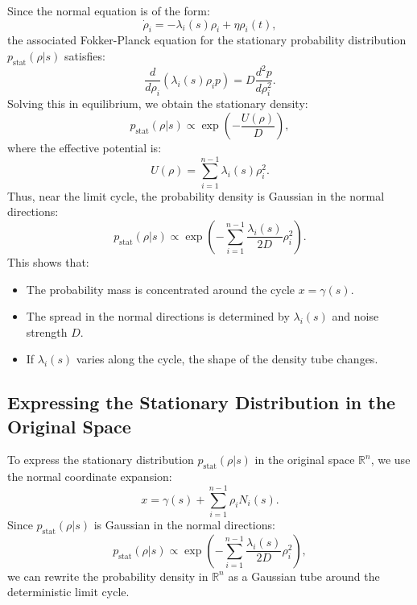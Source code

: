 \documentclass{article}
\theoremstyle{definition} \newtheorem{definition}{Definition}
\theoremstyle{remark} \newtheorem{remark}{Remark}
\newcounter{ct}
\begin{document}
Since the normal equation is of the form:
\begin{equation}
    \dot{\rho}_i = -\lambda_i(s) \rho_i + \eta \rho_i(t),
\end{equation}
the associated Fokker-Planck equation for the stationary probability distribution $p_{\text{stat}}(\rho | s)$ satisfies:
\begin{equation}
    \frac{d}{d \rho_i} \left( \lambda_i(s) \rho_i p \right) = D \frac{d^2 p}{d \rho_i^2}.
\end{equation}
Solving this in equilibrium, we obtain the stationary density:
\begin{equation}
    p_{\text{stat}}(\rho | s) \propto \exp \left( - \frac{U(\rho)}{D} \right),
\end{equation}
where the effective potential is:
\begin{equation}
    U(\rho) = \sum_{i=1}^{n-1} \lambda_i(s) \rho_i^2.
\end{equation}
Thus, near the limit cycle, the probability density is Gaussian in the normal directions:
\begin{equation}
    p_{\text{stat}}(\rho | s) \propto \exp \left( - \sum_{i=1}^{n-1} \frac{\lambda_i(s)}{2D} \rho_i^2 \right).
\end{equation}
This shows that:
\begin{itemize}
    \item The probability mass is concentrated around the cycle $x = \gamma(s)$.
    \item The spread in the normal directions is determined by $\lambda_i(s)$ and noise strength $D$.
    \item If $\lambda_i(s)$ varies along the cycle, the shape of the density tube changes.
\end{itemize}


\subsection{Expressing the Stationary Distribution in the Original Space}
To express the stationary distribution $p_{\text{stat}}(\rho | s)$ in the original space $\mathbb{R}^n$, we use the normal coordinate expansion:
\begin{equation}
    x = \gamma(s) + \sum_{i=1}^{n-1} \rho_i N_i(s).
\end{equation}
Since $p_{\text{stat}}(\rho | s)$ is Gaussian in the normal directions:
\begin{equation}
    p_{\text{stat}}(\rho | s) \propto \exp \left( - \sum_{i=1}^{n-1} \frac{\lambda_i(s)}{2D} \rho_i^2 \right),
\end{equation}
we can rewrite the probability density in $\mathbb{R}^n$ as a Gaussian tube around the deterministic limit cycle.
\end{document}
